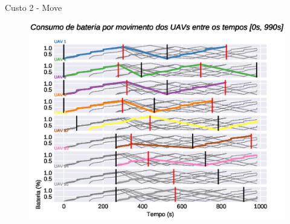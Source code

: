 \begin{frame}{Custo 2 - Move}
            \begin{figure}[!htb]
                    \includegraphics[width=\textwidth]{custo_2/uav_move_acum_all.eps}
                \end{figure}
        \end{frame}
